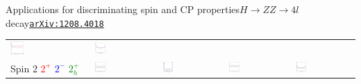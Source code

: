 \documentclass[usenames,dvipsnames,svgnames,table]{beamer}
\newcommand{\arxiv}[1]{\href{http://arxiv.org/abs/#1}{\nolinkurl{arXiv:#1}}}
\begin{document}
\begin{frame}{Applications for discriminating spin and CP properties}{$H\to ZZ\to 4l$ decay\hfill \arxiv{1208.4018}}
\begin{tabular}{m{}m{}m{}m{}m{}}
\noindent\includegraphics[width=0.18\textwidth]{onthespinandparity/phistar1_125GeV_spin1} &
\noindent\includegraphics[width=0.18\textwidth]{onthespinandparity/costheta1_125GeV_spin1} \\
\footnotesize\centering Spin 2 \tiny \textcolor{red}{$2^+$} \textcolor{blue}{$2^-$} \textcolor{Green}{$2_h^+$} &
\noindent\includegraphics[width=0.18\textwidth]{onthespinandparity/phi_125GeV_spin2} &
\noindent\includegraphics[width=0.18\textwidth]{onthespinandparity/costhetastar_125GeV_spin2}&
\noindent\includegraphics[width=0.18\textwidth]{onthespinandparity/phistar1_125GeV_spin2} &
\noindent\includegraphics[width=0.18\textwidth]{onthespinandparity/costheta1_125GeV_spin2}
\end{tabular}
\end{frame}
\end{document}
